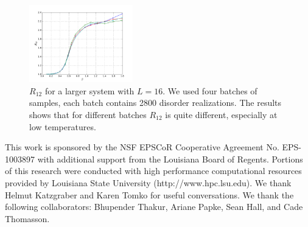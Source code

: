 \documentclass[aps,prb,twocolumn,showpacs,superscriptaddress]{revtex4}
\begin{document}
\begin{figure}[ht]
  \centering
  \includegraphics[width=0.4\textwidth]{img/l16_r12.pdf}
  \caption{$R_{12}$ for a larger system with $L=16$. We used four batches of samples,
each batch contains 2800 disorder realizations. The results shows that for
different batches $R_{12}$ is quite different, especially at low temperatures.
}
\label{fig:l16_r12}
\end{figure}


This work is sponsored by the NSF EPSCoR Cooperative Agreement No. EPS-1003897 with additional support 
from the Louisiana Board of Regents. Portions of this research were conducted with high performance computational resources provided by 
Louisiana State University (http://www.hpc.lsu.edu). We thank Helmut Katzgraber and Karen 
Tomko for useful conversations. We thank the following collaborators: Bhupender Thakur, Ariane Papke, Sean Hall, and Cade Thomasson. 


\end{document}
